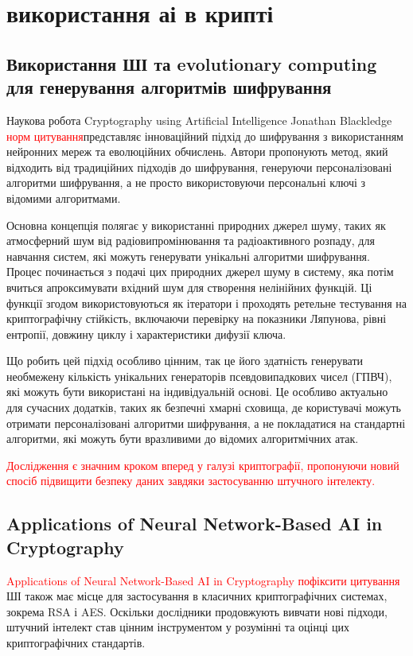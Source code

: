 
\section{використання аі в крипті}
\subsection{Використання ШІ та evolutionary computing для генерування алгоритмів шифрування}
Наукова робота Cryptography using Artificial Intelligence Jonathan Blackledge \textcolor{red}{норм цитування}представляє інноваційний підхід до шифрування з використанням нейронних мереж та еволюційних обчислень. Автори пропонують метод, який відходить від традиційних підходів до шифрування, генеруючи персоналізовані алгоритми шифрування, а не просто використовуючи персональні ключі з відомими алгоритмами.

Основна концепція полягає у використанні природних джерел шуму, таких як атмосферний шум від радіовипромінювання та радіоактивного розпаду, для навчання систем, які можуть генерувати унікальні алгоритми шифрування. Процес починається з подачі цих природних джерел шуму в систему, яка потім вчиться апроксимувати вхідний шум для створення нелінійних функцій. Ці функції згодом використовуються як ітератори і проходять ретельне тестування на криптографічну стійкість, включаючи перевірку на показники Ляпунова, рівні ентропії, довжину циклу і характеристики дифузії ключа.

Що робить цей підхід особливо цінним, так це його здатність генерувати необмежену кількість унікальних генераторів псевдовипадкових чисел (ГПВЧ), які можуть бути використані на індивідуальній основі. Це особливо актуально для сучасних додатків, таких як безпечні хмарні сховища, де користувачі можуть отримати персоналізовані алгоритми шифрування, а не покладатися на стандартні алгоритми, які можуть бути вразливими до відомих алгоритмічних атак.

\textcolor{red}{Дослідження є значним кроком вперед у галузі криптографії, пропонуючи новий спосіб підвищити безпеку даних завдяки застосуванню штучного інтелекту.}

\subsection{Applications of Neural Network-Based AI in Cryptography}
\textcolor{red}{Applications of Neural Network-Based AI in Cryptography пофіксити цитування} 
ШІ також має місце для застосування в класичних криптографічних системах, зокрема RSA і AES. Оскільки дослідники продовжують вивчати нові підходи, штучний інтелект став цінним інструментом у розумінні та оцінці цих криптографічних стандартів.

